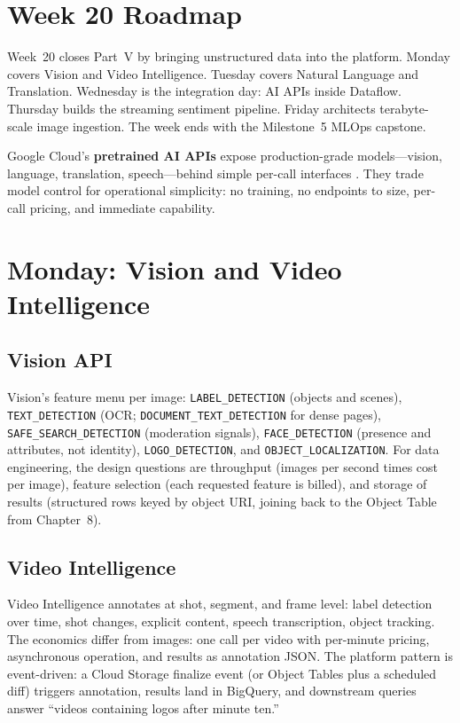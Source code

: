 \section{Week 20 Roadmap}
Week~20 closes Part~V by bringing unstructured data into the platform. Monday covers Vision and Video Intelligence. Tuesday covers Natural Language and Translation. Wednesday is the integration day: AI APIs inside Dataflow. Thursday builds the streaming sentiment pipeline. Friday architects terabyte-scale image ingestion. The week ends with the Milestone~5 MLOps capstone.

\begin{definitionbox}
Google Cloud's \textbf{pretrained AI APIs} expose production-grade models---vision, language, translation, speech---behind simple per-call interfaces \cite{googlecloudaiapis}. They trade model control for operational simplicity: no training, no endpoints to size, per-call pricing, and immediate capability.
\end{definitionbox}

\section{Monday: Vision and Video Intelligence}

\subsection{Vision API}
Vision's feature menu per image: \texttt{LABEL\_DETECTION} (objects and scenes), \texttt{TEXT\_DETECTION} (OCR; \texttt{DOCUMENT\_TEXT\_DETECTION} for dense pages), \texttt{SAFE\_SEARCH\_DETECTION} (moderation signals), \texttt{FACE\_DETECTION} (presence and attributes, not identity), \texttt{LOGO\_DETECTION}, and \texttt{OBJECT\_LOCALIZATION}. For data engineering, the design questions are throughput (images per second times cost per image), feature selection (each requested feature is billed), and storage of results (structured rows keyed by object URI, joining back to the Object Table from Chapter~8).

\subsection{Video Intelligence}
Video Intelligence annotates at shot, segment, and frame level: label detection over time, shot changes, explicit content, speech transcription, object tracking. The economics differ from images: one call per video with per-minute pricing, asynchronous operation, and results as annotation JSON. The platform pattern is event-driven: a Cloud Storage finalize event (or Object Tables plus a scheduled diff) triggers annotation, results land in BigQuery, and downstream queries answer ``videos containing logos after minute ten.''

